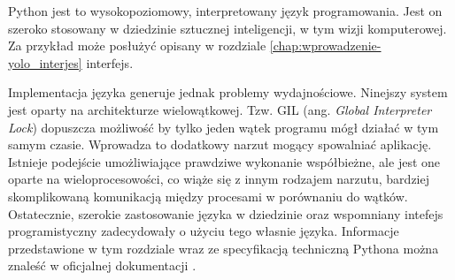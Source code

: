 Python jest to wysokopoziomowy, interpretowany język programowania. Jest on szeroko stosowany w dziedzinie sztucznej inteligencji, w tym wizji komputerowej. Za przykład może posłużyć opisany w rozdziale \ref{chap:wprowadzenie-yolo_interjes} interfejs. 

Implementacja języka generuje jednak problemy wydajnościowe. Ninejszy system jest oparty na architekturze wielowątkowej. Tzw. GIL (ang. \emph{Global Interpreter Lock}) dopuszcza możliwość by tylko jeden wątek programu mógł działać w tym samym czasie. Wprowadza to dodatkowy narzut mogący spowalniać aplikację. Istnieje podejście umożliwiające prawdziwe wykonanie współbieżne, ale jest one oparte na wieloprocesowości, co wiąże się z innym rodzajem narzutu, bardziej skomplikowaną komunikacją między procesami w porównaniu do wątków. Ostatecznie, szerokie zastosowanie języka w dziedzinie oraz wspomniany intefejs programistyczny zadecydowały o użyciu tego własnie języka. Informacje przedstawione w tym rozdziale wraz ze specyfikacją techniczną Pythona można znaleść w oficjalnej dokumentacji \cite{Python_docs}. 